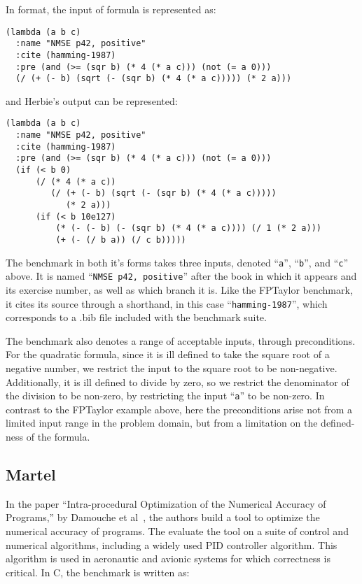 \documentclass[main.tex]{subfiles}
\begin{document}
In \core format, the input of formula is represented as:

\begin{verbatim}
(lambda (a b c)
  :name "NMSE p42, positive"
  :cite (hamming-1987)
  :pre (and (>= (sqr b) (* 4 (* a c))) (not (= a 0)))
  (/ (+ (- b) (sqrt (- (sqr b) (* 4 (* a c))))) (* 2 a)))
\end{verbatim}

and Herbie's output can be represented:

\begin{verbatim}
(lambda (a b c)
  :name "NMSE p42, positive"
  :cite (hamming-1987)
  :pre (and (>= (sqr b) (* 4 (* a c))) (not (= a 0)))
  (if (< b 0)
      (/ (* 4 (* a c))
         (/ (+ (- b) (sqrt (- (sqr b) (* 4 (* a c)))))
            (* 2 a)))
      (if (< b 10e127)
          (* (- (- b) (- (sqr b) (* 4 (* a c)))) (/ 1 (* 2 a)))
          (+ (- (/ b a)) (/ c b)))))
\end{verbatim}

The benchmark in both it's forms takes three inputs, denoted
``\verb|a|'', ``\verb|b|'', and ``\verb|c|'' above. It is named
``\verb|NMSE p42, positive|'' after the book in which it appears and
its exercise number, as well as which branch it is. Like the FPTaylor
benchmark, it cites its source through a shorthand, in this case
``\verb|hamming-1987|'', which corresponds to a .bib file included
with the benchmark suite.

The benchmark also denotes a range of acceptable inputs, through
preconditions. For the quadratic formula, since it is ill defined to
take the square root of a negative number, we restrict the input to
the square root to be non-negative. Additionally, it is ill defined to
divide by zero, so we restrict the denominator of the division to be
non-zero, by restricting the input ``\verb|a|'' to be non-zero. In
contrast to the FPTaylor example above, here the preconditions arise
not from a limited input range in the problem domain, but from a
limitation on the defined-ness of the formula.

\subsection{Martel}
In the paper ``Intra-procedural Optimization of the Numerical Accuracy
of Programs,'' by Damouche et al~\cite{fmics15}, the authors build a
tool to optimize the numerical accuracy of programs. The evaluate the
tool on a suite of control and numerical algorithms, including a
widely used PID controller algorithm. This algorithm is used in
aeronautic and avionic systems for which correctness is critical. In
C, the benchmark is written as:
\end{document}
